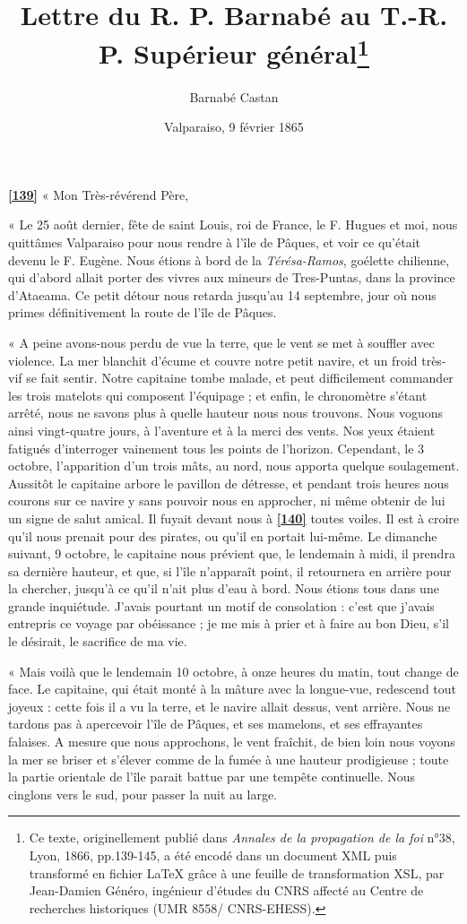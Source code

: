 \documentclass{article}
\title{Lettre du R. P. Barnabé au T.-R. P. Supérieur général\footnote{Ce texte, originellement publié dans \textit{Annales de la propagation de la foi} n°38, Lyon, 1866, pp.139-145, a été encodé dans un document XML puis transformé en fichier \LaTeX{} grâce à une feuille de transformation XSL, par Jean-Damien Généro, ingénieur d'études du CNRS affecté au Centre de recherches historiques (UMR 8558/ CNRS-EHESS).}}
\author{Barnabé Castan}
\date{Valparaiso, 9 février 1865}
\begin{document}
        \maketitle
        
      
         
        
    \href{https://gallica.bnf.fr/iiif/ark:/12148/bpt6k5449280k/f146/full/full/0/native.jpg}{\textbf{[139]}} « Mon Très-révérend Père,
         
        
    « Le 25 août dernier, fête de saint Louis, roi de France, le F. Hugues et moi, nous quittâmes Valparaiso pour nous rendre à l'île de Pâques, et voir ce qu'était devenu le F. Eugène. Nous étions à bord de la \textit{Térésa-Ramos}, goélette chilienne, qui d'abord allait porter des vivres aux mineurs de Tres-Puntas, dans la province d'Ataeama. Ce petit détour nous retarda jusqu'au 14 septembre, jour où nous primes définitivement la route de l'île de Pâques.
         
        
    « A peine avons-nous perdu de vue la terre, que le vent se met à souffler avec violence. La mer blanchit d'écume et couvre notre petit navire, et un froid très-vif se fait sentir. Notre capitaine tombe malade, et peut difficilement commander les trois matelots qui composent l'équipage ; et enfin, le chronomètre s'étant arrêté, nous ne savons plus à quelle hauteur nous nous trouvons. Nous voguons ainsi vingt-quatre jours, à l'aventure et à la merci des vents. Nos yeux étaient fatigués d'interroger vainement tous les points de l'horizon. Cependant, le 3 octobre, l'apparition d'un trois mâts, au nord, nous apporta quelque soulagement. Aussitôt le capitaine arbore le pavillon de détresse, et pendant trois heures nous courons sur ce navire y sans pouvoir nous en approcher, ni même obtenir de lui un signe de salut amical. Il fuyait devant nous à \href{https://gallica.bnf.fr/iiif/ark:/12148/bpt6k5449280k/f147/full/full/0/native.jpg}{\textbf{[140]}} toutes voiles. Il est à croire qu'il nous prenait pour des pirates, ou qu'il en portait lui-même. Le dimanche suivant, 9 octobre, le capitaine nous prévient que, le lendemain à midi, il prendra sa dernière hauteur, et que, si l'île n'apparaît point, il retournera en arrière pour la chercher, jusqu'à ce qu'il n'ait plus d'eau à bord. Nous étions tous dans une grande inquiétude. J'avais pourtant un motif de consolation : c'est que j'avais entrepris ce voyage par obéissance ; je me mis à prier et à faire au bon Dieu, s'il le désirait, le sacrifice de ma vie.
         
        
    « Mais voilà que le lendemain 10 octobre, à onze heures du matin, tout change de face. Le capitaine, qui était monté à la mâture avec la longue-vue, redescend tout joyeux : cette fois il a vu la terre, et le navire allait dessus, vent arrière. Nous ne tardons pas à apercevoir l'île de Pâques, et ses mamelons, et ses effrayantes falaises. A mesure que nous approchons, le vent fraîchit, de bien loin nous voyons la mer se briser et s'élever comme de la fumée à une hauteur prodigieuse ; toute la partie orientale de l'île parait battue par une tempête continuelle. Nous cinglons vers le sud, pour passer la nuit au large.
         
\end{document}
